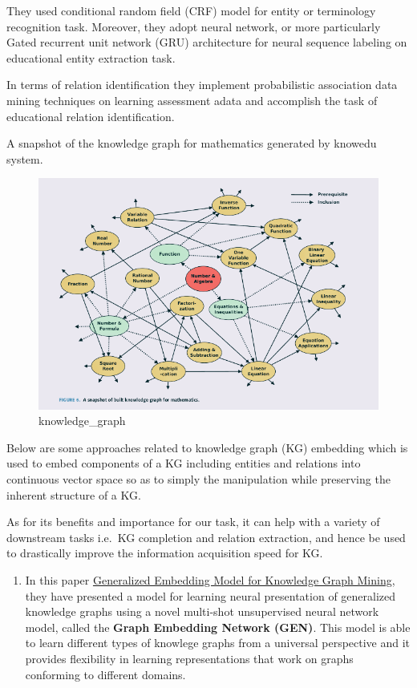 \documentclass{acm_proc_article-sp}
\providecommand{\tightlist}{%
  \setlength{\itemsep}{0pt}\setlength{\parskip}{0pt}}
\begin{document}
They used conditional random field (CRF) model for entity or terminology
recognition task. Moreover, they adopt neural network, or more
particularly Gated recurrent unit network (GRU) architecture for neural
sequence labeling on educational entity extraction task.

In terms of relation identification they implement probabilistic
association data mining techniques on learning assessment adata and
accomplish the task of educational relation identification.

A snapshot of the knowledge graph for mathematics generated by knowedu
system.

\begin{figure}
\centering
\includegraphics{img/kg.png}
\caption{knowledge\_graph}
\end{figure}

Below are some approaches related to knowledge graph (KG) embedding
which is used to embed components of a KG including entities and
relations into continuous vector space so as to simply the manipulation
while preserving the inherent structure of a KG.

As for its benefits and importance for our task, it can help with a
variety of downstream tasks i.e.~KG completion and relation extraction,
and hence be used to drastically improve the information acquisition
speed for KG.

\begin{enumerate}
\def\labelenumi{\arabic{enumi}.}
\setcounter{enumi}{1}
\tightlist
\item
  In this paper
  \href{http://www.mlgworkshop.org/2018/papers/MLG2018_paper_5.pdf}{Generalized
  Embedding Model for Knowledge Graph Mining}, they have presented a
  model for learning neural presentation of generalized knowledge graphs
  using a novel multi-shot unsupervised neural network model, called the
  \textbf{Graph Embedding Network (GEN)}. This model is able to learn
  different types of knowlege graphs from a universal perspective and it
  provides flexibility in learning representations that work on graphs
  conforming to different domains.
\end{enumerate}
\end{document}
